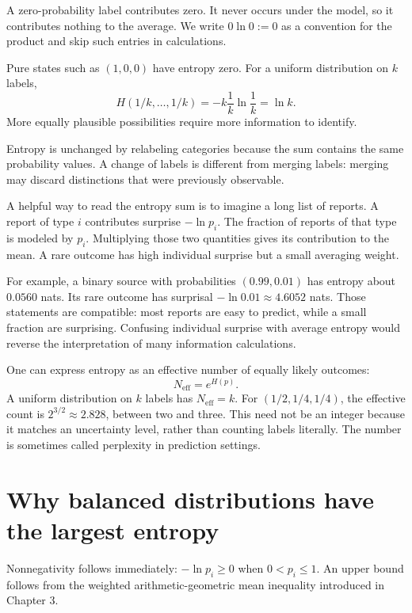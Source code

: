 \documentclass[11pt,oneside,openany]{book}
\theoremstyle{definition}
\theoremstyle{remark}
\numberwithin{equation}{chapter}
\begin{document}
A zero-probability label contributes zero. It never occurs under the model, so it contributes nothing to the average. We write \(0\ln0:=0\) as a convention for the product and skip such entries in calculations.

Pure states such as \((1,0,0)\) have entropy zero. For a uniform distribution on \(k\) labels, \[H(1/k,\ldots,1/k)=-k\frac1k\ln\frac1k=\ln k.\] More equally plausible possibilities require more information to identify.

Entropy is unchanged by relabeling categories because the sum contains the same probability values. A change of labels is different from merging labels: merging may discard distinctions that were previously observable.

A helpful way to read the entropy sum is to imagine a long list of reports. A report of type \(i\) contributes surprise \(-\ln p_i\). The fraction of reports of that type is modeled by \(p_i\). Multiplying those two quantities gives its contribution to the mean. A rare outcome has high individual surprise but a small averaging weight.

For example, a binary source with probabilities \((0.99,0.01)\) has entropy about \(0.0560\) nats. Its rare outcome has surprisal \(-\ln0.01\approx4.6052\) nats. Those statements are compatible: most reports are easy to predict, while a small fraction are surprising. Confusing individual surprise with average entropy would reverse the interpretation of many information calculations.

One can express entropy as an effective number of equally likely outcomes: \[N_{\mathrm{eff}}=e^{H(p)}.\] A uniform distribution on \(k\) labels has \(N_{\mathrm{eff}}=k\). For \((1/2,1/4,1/4)\), the effective count is \(2^{3/2}\approx2.828\), between two and three. This need not be an integer because it matches an uncertainty level, rather than counting labels literally. The number is sometimes called perplexity in prediction settings.

\section{Why balanced distributions have the largest entropy}\label{ch05-why-balanced-distributions-have-the-largest-entropy}

Nonnegativity follows immediately: \(-\ln p_i\geq0\) when \(0<p_i\leq1\). An upper bound follows from the weighted arithmetic-geometric mean inequality introduced in Chapter 3.
\end{document}
